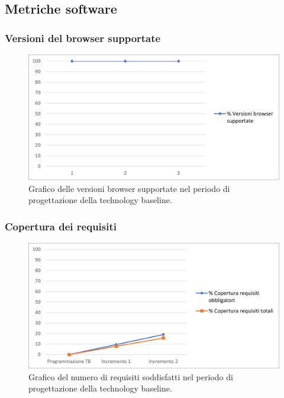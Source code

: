 \subsection{Metriche software}
\subsubsection{Versioni del browser supportate}
\begin{figure}[h]
	\centering
	\includegraphics[width=13cm]{Images/BrowserSupportati.png}
	\caption{Graﬁco delle versioni browser supportate nel periodo di progettazione della technology baseline.}
\end{figure}

\subsubsection{Copertura dei requisiti}
\begin{figure}[h]
	\centering
	\includegraphics[width=14cm]{Images/CoperturaRequisiti.png}
	\caption{Graﬁco del numero di requisiti soddisfatti nel periodo di progettazione della technology baseline.}
\end{figure}

\newpage
